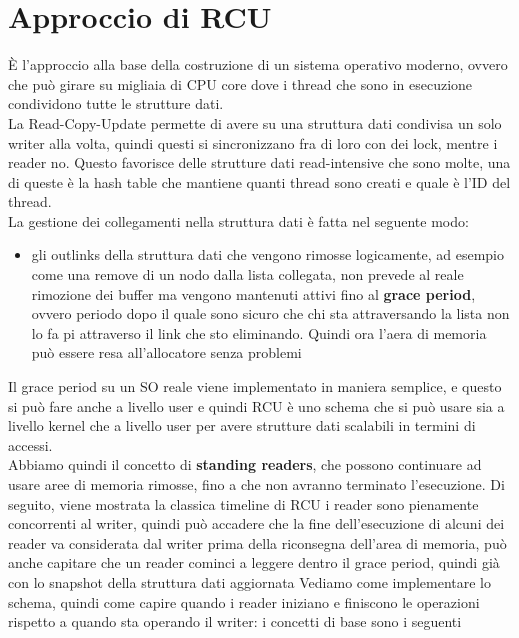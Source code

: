 \documentclass[12pt, oneside]{extbook}
\begin{document}
\section{Approccio di RCU}
È l'approccio alla base della costruzione di un sistema operativo moderno, ovvero che può girare su migliaia di CPU core dove i thread che sono in esecuzione condividono tutte le strutture dati.\\ La Read-Copy-Update permette di avere su una struttura dati condivisa un solo writer alla volta, quindi questi si sincronizzano fra di loro con dei lock, mentre i reader no. Questo favorisce delle strutture dati read-intensive che sono molte, una di queste è la hash table che mantiene quanti thread sono creati e quale è l'ID del thread.\\ La gestione dei collegamenti nella struttura dati è fatta nel seguente modo:
\begin{itemize}
\item gli outlinks della struttura dati che vengono rimosse logicamente, ad esempio come una remove di un nodo dalla lista collegata, non prevede al reale rimozione dei buffer ma vengono mantenuti attivi fino al \textbf{grace period}, ovvero periodo dopo il quale sono sicuro che chi sta attraversando la lista non lo fa pi attraverso il link che sto eliminando. Quindi ora l'aera di memoria può essere resa all'allocatore senza problemi
\end{itemize}
Il grace period su un SO reale viene implementato in maniera semplice, e questo si può fare anche a livello user e quindi RCU è uno schema che si può usare sia a livello kernel che a livello user per avere strutture dati scalabili in termini di accessi.\\ Abbiamo quindi il concetto di \textbf{standing readers}, che possono continuare ad usare aree di memoria rimosse, fino a che non avranno terminato l'esecuzione. Di seguito, viene mostrata la classica timeline di RCU
i reader sono pienamente concorrenti al writer, quindi può accadere che la fine dell'esecuzione di alcuni dei reader va considerata dal writer prima della riconsegna dell'area di memoria, può anche capitare che un reader cominci a leggere dentro il grace period, quindi già con lo snapshot della struttura dati aggiornata%
Vediamo come implementare lo schema, quindi come capire quando i reader iniziano e finiscono le operazioni rispetto a quando sta operando il writer: i concetti di base sono i seguenti\\
\end{document}
